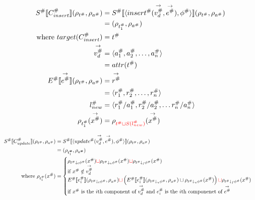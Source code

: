 \begin{align*}
    S^\# \llbracket C_{insert}^\# \rrbracket (\rho_{t^\#}, \rho_{a^\#})
    &= S^\# \llbracket \langle insert^\#(\overset{\rightarrow}{v_d^\#}, \overset{\rightarrow}{e^\#}), \phi^\# \rangle \rrbracket (\rho_{t^\#}, \rho_{a^\#}) \\
    &= (\rho_{t_1^\#}, \rho_{a^\#}) \\
    \text{where } target(C_{insert}^\#) &= t^\# \\
    \overset{\rightarrow}{v_d^\#} &= \langle a_1^\#, a_2^\#, \dots, a_n^\# \rangle \\
    &= attr(t^\#) \\
    E^\# \llbracket \overset{\rightarrow}{e^\#} \rrbracket (\rho_{t^\#}, \rho_{a^\#})
    &= \overset{\rightarrow}{r^\#} \\
    &= \langle r_1^\#, r_2^\#, \dots, r_n^\# \rangle \\
    l_{new}^\# &= \langle r_1^\#/a_1^\#, r_2^\#/a_2^\#, \dots r_n^\#/a_n^\# \rangle \\
    \rho_{t_1^\#}(\overset{\rightarrow}{x^\#}) &= \rho_{\textcolor{red}{t^\# \sqcup S(l_{new}^\#)}}(\overset{\rightarrow}{x^\#})
\end{align*}



\begin{align*}
    S^\# \llbracket C^\#_{update} \rrbracket(\rho_{t^\#}, \rho_{a^\#})
    &= S^\# \llbracket \langle update^\#(\overset{\rightarrow}{v_d^\#}, \overset{\rightarrow}{e^\#}), \phi^\# \rangle \rrbracket (\rho_{t^\#}, \rho_{a^\#}) \\
    &= (\rho_{t^\#_1}, \rho_{a^\#}) \\
    \text{where } \rho_{t^\#_1}(x^\#) &=
    \begin{cases}
        \rho_{t^\# \downarrow_t \phi^\#}(x^\#) \textcolor{red}{\sqcup} \rho_{t^\# \downarrow_u \phi^\#}(x^\#) \textcolor{red}{\sqcup} \rho_{t^\# \downarrow_f \phi^\#}(x^\#) \\
        \text{if } x^\# \notin \overset{\rightarrow}{v_d^\#} \\
        E^\# \llbracket e^\#_{i} \rrbracket(\rho_{t^\# \downarrow_t \phi^\#}, \rho_{a^\#}) \textcolor{red}{\sqcup}
        \left( E^\# \llbracket e^\#_{i} \rrbracket(\rho_{t^\# \downarrow_u \phi^\#}, \rho_{a^\#}) \sqcup \rho_{t^\# \downarrow_u \phi^\#}(x^\#) \right) \textcolor{red}{\sqcup} \rho_{t^\# \downarrow_f \phi^\#}(x^\#) \\
        \text{if $x^\#$ is the $i$th component of $\overset{\rightarrow}{v_d^\#}$ and $e^\#_{i}$ is the $i$th componenet of $\overset{\rightarrow}{e^\#}$} \\
    \end{cases}
\end{align*}


